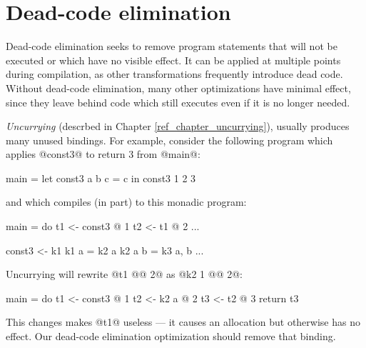 \documentclass[12pt]{report}
\begin{document}


\chapter{Dead-code elimination}

Dead-code elimination seeks to remove program statements that will not
be executed or which have no visible effect. It can be applied at multiple
points during compilation, as other transformations frequently introduce 
dead code. Without dead-code elimination, many other optimizations have
minimal effect, since they leave behind code which still executes even if
it is no longer needed.

\emph{Uncurrying} (descrbed in Chapter \ref{ref_chapter_uncurrying}),
usually produces many unused bindings. For example, consider the
following program which applies @const3@ to return 3 from @main@:

\begin{code}
main = 
  let const3 a b c = c 
  in const3 1 2 3
\end{code}

\noindent
and which compiles (in part) to this monadic program:

\begin{code}
main = do
  t1 <- const3 @ 1
  t2 <- t1 @ 2
  ...
 
const3 <- k1 {}
k1 {} a = k2 {a} 
k2 {a} b = k3 {a, b}
...
\end{code}

Uncurrying will rewrite @t1 @@ 2@ as @k2 {1} @@ 2@:

\begin{code}
main = do
 t1 <- const3 @ 1
 t2 <- k2 {a} @ 2 
 t3 <- t2 @ 3
 return t3
\end{code}

This changes makes @t1@ useless --- it causes an allocation but otherwise 
has no effect. Our dead-code elimination optimization should remove that binding.

\end{document}
